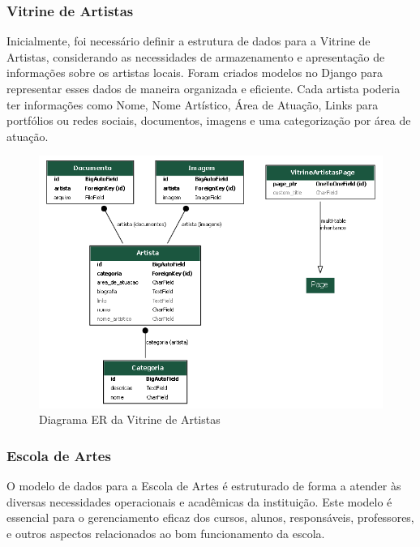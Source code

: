 \subsubsection{Vitrine de Artistas}

Inicialmente, foi necessário definir a estrutura de dados para a Vitrine de Artistas, considerando as necessidades de armazenamento e apresentação de informações sobre os artistas locais. Foram criados modelos no Django para representar esses dados de maneira organizada e eficiente. Cada artista poderia ter informações como Nome, Nome Artístico, Área de Atuação, Links para portfólios ou redes sociais, documentos, imagens e uma categorização por área de atuação.

\begin{figure}[htb]
	\centering
	 \begin{minipage}{0.4\textwidth}
	   \centering
	   \caption{Diagrama ER da Vitrine de Artistas} \label{er_diagram_vitrine}
	   \includegraphics[scale=0.5]{./img/er_diagram_vitrine.png}
	 \end{minipage}
\end{figure}

\subsubsection{Escola de Artes}

O modelo de dados para a Escola de Artes é estruturado de forma a atender às diversas necessidades operacionais e acadêmicas da instituição. Este modelo é essencial para o gerenciamento eficaz dos cursos, alunos, responsáveis, professores, e outros aspectos relacionados ao bom funcionamento da escola.

